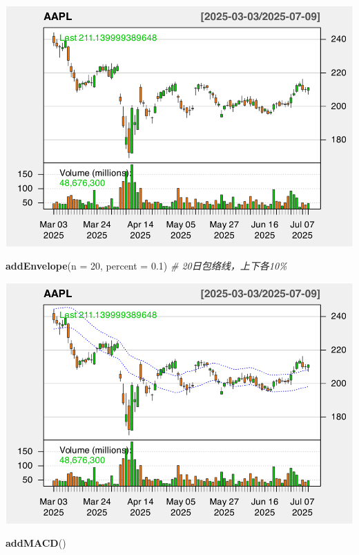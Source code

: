 \documentclass[]{ctexbook}
\newenvironment{Shaded}{\begin{snugshade}}{\end{snugshade}}
\newcommand{\AttributeTok}[1]{\textcolor[rgb]{0.13,0.29,0.53}{#1}}
\newcommand{\CommentTok}[1]{\textcolor[rgb]{0.56,0.35,0.01}{\textit{#1}}}
\newcommand{\DecValTok}[1]{\textcolor[rgb]{0.00,0.00,0.81}{#1}}
\newcommand{\FloatTok}[1]{\textcolor[rgb]{0.00,0.00,0.81}{#1}}
\newcommand{\FunctionTok}[1]{\textcolor[rgb]{0.13,0.29,0.53}{\textbf{#1}}}
\newcommand{\NormalTok}[1]{#1}
\begin{document}
\includegraphics[width=0.9\linewidth]{quantmod_files/figure-latex/envol_2-1}

\begin{Shaded}
\begin{Highlighting}[]
\FunctionTok{addEnvelope}\NormalTok{(}\AttributeTok{n =} \DecValTok{20}\NormalTok{, }\AttributeTok{percent =} \FloatTok{0.1}\NormalTok{)  }\CommentTok{\# 20日包络线，上下各10\%}
\end{Highlighting}
\end{Shaded}

\includegraphics[width=0.9\linewidth]{quantmod_files/figure-latex/envol_2-2}

\begin{Shaded}
\begin{Highlighting}[]
\FunctionTok{addMACD}\NormalTok{()}
\end{Highlighting}
\end{Shaded}
\end{document}
